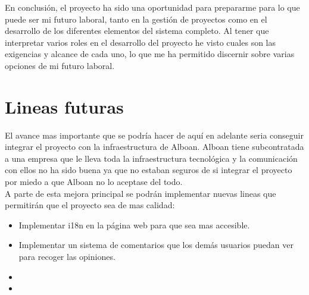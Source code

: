 En conclusión, el proyecto ha sido una oportunidad para prepararme para lo que puede ser mi futuro laboral, tanto en la gestión de proyectos como en el desarrollo de los diferentes elementos del sistema completo. Al tener que interpretar varios roles en el desarrollo del proyecto he visto cuales son las exigencias y alcance de cada uno, lo que me ha permitido discernir sobre varias opciones de mi futuro laboral.

\section{Lineas futuras}
El avance mas importante que se podría hacer de aquí en adelante seria conseguir integrar el proyecto con la infraestructura de Alboan. Alboan tiene subcontratada a una empresa que le lleva toda la infraestructura tecnológica y la comunicación con ellos no ha sido buena ya que no estaban seguros de si integrar el proyecto por miedo a que Alboan no lo aceptase del todo. \\

A parte de esta mejora principal se podrán implementar nuevas lineas que permitirán que el proyecto sea de mas calidad:

\begin{itemize}
	\item Implementar i18n en la página web para que sea mas accesible.
	\item Implementar un sistema de comentarios que los demás usuarios puedan ver para recoger las opiniones.
	\item 
	\item 
\end{itemize}